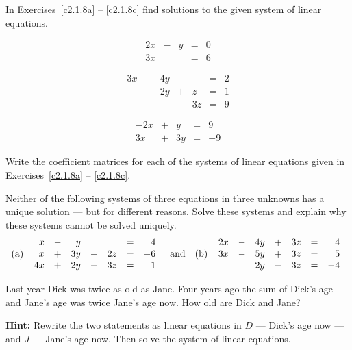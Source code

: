 \noindent In Exercises~\ref{c2.1.8a} -- \ref{c2.1.8c} find solutions
to the given system of linear equations.
\begin{exercise} \label{c2.1.8a}
\[
\begin{array}{rcrcr}
 2x & - & y & = & 0 \\
 3x &   &   & = & 6 \end{array}
\]
\end{exercise}
\begin{exercise} \label{c2.1.8b}
\[
\begin{array}{rcrcrcr}
 3x & - & 4y &   &    & = & 2\\
    &   & 2y & + & z  & = & 1\\
    &   &    &   & 3z & = & 9 \end{array}
\]
\end{exercise}
\begin{exercise} \label{c2.1.8c}
\[
\begin{array}{rcrcr}
 -2x & + &  y & = &  9 \\
  3x & + & 3y & = & -9 \end{array}
\]
\end{exercise}

\begin{exercise} \label{c2.1.8A}
Write the coefficient matrices for each of the systems of linear equations 
given in Exercises~\ref{c2.1.8a} -- \ref{c2.1.8c}.
\end{exercise}

\begin{exercise} \label{c2.1.9}
Neither of the following systems of three equations in three
unknowns has a unique solution --- but for different
reasons.  Solve these systems and explain why these systems
cannot be solved uniquely.
\[
\mbox{(a) }\; \begin{array}{rcrcrcr}
  x & - &  y &   &    & = &  4\\
  x & + & 3y & - & 2z & = & -6\\
 4x & + & 2y & - & 3z & = &  1
\end{array} \quad\mbox{and}\quad
\mbox{(b) }\; \begin{array}{rcrcrcr}
 2x & - & 4y & + & 3z & = &  4\\
 3x & - & 5y & + & 3z & = &  5\\
    &   & 2y & - & 3z & = & -4
\end{array}
\]
\end{exercise}

\begin{exercise} \label{c2.1.10}
Last year Dick was twice as old as Jane.  Four years ago the
sum of Dick's age and Jane's age was twice Jane's age now.  How
old are Dick and Jane?

{\bf Hint:} Rewrite the two statements
as linear equations in $D$ --- Dick's age now --- and $J$ ---
Jane's age now.  Then solve the system of linear equations.
\end{exercise}

